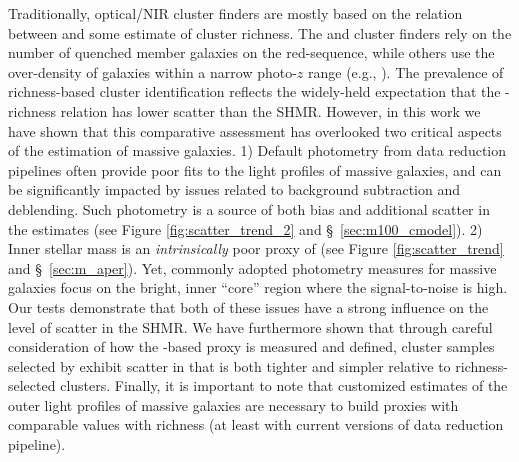 \documentclass[fleqn,usenatbib,useAMS]{mnras}
\begin{document}
    Traditionally, optical/NIR cluster finders are mostly based on the relation between \mvir{} and
    some estimate of cluster richness.
    The \redm{} and \camira{} cluster finders rely on the number of quenched member galaxies on the
    red-sequence, while others use the over-density of galaxies within a narrow photo-$z$ range
    (e.g., \citealt{Wen2021, Zou2021}). 
    The prevalence of richness-based cluster identification reflects the widely-held expectation
    that the \mvir{}-richness relation has lower scatter than the SHMR.
    However, in this work we have shown that this comparative assessment has overlooked two critical
    aspects of the \mstar{} estimation of massive galaxies.
    1) Default photometry from data reduction pipelines often provide poor fits to the light 
    profiles of massive galaxies, and can be significantly impacted by issues related to background
    subtraction and deblending.
    Such photometry is a source of both bias and additional scatter in the \mstar{} estimates (see
    Figure \ref{fig:scatter_trend_2} and \S\ \ref{sec:m100_cmodel}). 
    2) Inner stellar mass is an {\em intrinsically} poor proxy of \mvir{} (see Figure
    \ref{fig:scatter_trend} and \S\ \ref{sec:m_aper}).
    Yet, commonly adopted photometry measures for massive galaxies focus on the bright, inner
    ``core'' region where the signal-to-noise is high. 
    Our \topn{} tests demonstrate that both of these issues have a strong influence on the level of
    scatter in the SHMR. 
    We have furthermore shown that through careful consideration of how the \mstar{}-based proxy is
    measured and defined, cluster samples selected by \mstar{} exhibit scatter in \mvir{} that is
    both tighter and simpler relative to richness-selected clusters. 
    Finally, it is important to note that customized estimates of the outer light profiles of
    massive galaxies are necessary to build \mvir{} proxies with comparable \sigmvir{} values with
    richness (at least with current versions of data reduction pipeline).
    
\end{document}
